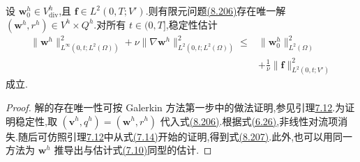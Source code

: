 \begin{lemma}
\label{lem:leray-alpha-fem-existence-uniqueness-stability}
设 $\bm{w}_0^h\in V_{\mathrm{div}}^h$,且
$\bm{f}\in L^2(0,T;V')$.则有限元问题\hyperref[eq:leray-alpha-continuous-in-time-fem-model]{(8.206)}存在唯一解
$(\bm{w}^h,r^h)\in V^h\times Q^h$.对所有 $t\in(0,T]$,稳定性估计
\begin{equation}\label{eq:leray-alpha-fem-stability}
\begin{aligned}
 \|\bm{w}^h\|_{L^\infty(0,t;L^2(\Omega))}^2
 +\nu\|\nabla\bm{w}^h\|_{L^2(0,t;L^2(\Omega))}^2
 \le{}&\|\bm{w}_0^h\|_{L^2(\Omega)}^2\\
 &+\frac{1}{\nu}
   \|\bm{f}\|_{L^2(0,t;V')}^2
\end{aligned}
\end{equation}
成立.
\begin{proof}
解的存在唯一性可按 Galerkin 方法第一步中的做法证明,参见引理\hyperref[lem:time-dependent-galerkin-unique]{7.12}.为证明稳定性,取
$(\bm{v}^h,q^h)=(\bm{w}^h,r^h)$ 代入式\hyperref[eq:leray-alpha-continuous-in-time-fem-model]{(8.206)}.根据式\hyperref[eq:steady-ns-convection-zero-rot-skew]{(6.26)},非线性对流项消失.随后可仿照引理\hyperref[lem:time-dependent-galerkin-unique]{7.12}中从式\hyperref[eq:time-dependent-galerkin-energy-step]{(7.14)}开始的证明,得到式\hyperref[eq:leray-alpha-fem-stability]{(8.207)}.此外,也可以用同一方法为 $\bm{w}^h$ 推导出与估计式\hyperref[eq:time-dependent-galerkin-estimate-sup]{(7.10)}同型的估计.
\end{proof}
\end{lemma}

